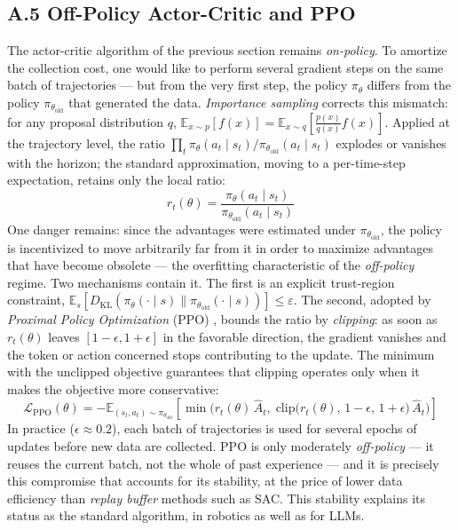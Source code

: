 \documentclass[11pt,a4paper]{article}
\begin{document}
\subsection*{A.5 Off-Policy Actor-Critic and PPO}
The actor-critic algorithm of the previous section remains \emph{on-policy}. To amortize the collection cost, one would like to perform several gradient steps on the same batch of trajectories — but from the very first step, the policy $\pi_\theta$ differs from the policy $\pi_{\theta_{\text{old}}}$ that generated the data. \emph{Importance sampling} corrects this mismatch: for any proposal distribution $q$, $\mathbb{E}_{x \sim p}[f(x)] = \mathbb{E}_{x \sim q}[\frac{p(x)}{q(x)} f(x)]$. Applied at the trajectory level, the ratio $\prod_t \pi_\theta(a_t \mid s_t)/\pi_{\theta_{\text{old}}}(a_t \mid s_t)$ explodes or vanishes with the horizon; the standard approximation, moving to a per-time-step expectation, retains only the local ratio:
\begin{equation}
r_t(\theta) = \frac{\pi_\theta(a_t \mid s_t)}{\pi_{\theta_{\text{old}}}(a_t \mid s_t)}
\end{equation}
One danger remains: since the advantages were estimated under $\pi_{\theta_{\text{old}}}$, the policy is incentivized to move arbitrarily far from it in order to maximize advantages that have become obsolete — the overfitting characteristic of the \emph{off-policy} regime. Two mechanisms contain it. The first is an explicit trust-region constraint, $\mathbb{E}_s[D_{\text{KL}}(\pi_\theta(\cdot \mid s) \parallel \pi_{\theta_{\text{old}}}(\cdot \mid s))] \leq \varepsilon$. The second, adopted by \emph{Proximal Policy Optimization} (PPO) \cite{schulman2017proximal}, bounds the ratio by \emph{clipping}: as soon as $r_t(\theta)$ leaves $[1-\epsilon, 1+\epsilon]$ in the favorable direction, the gradient vanishes and the token or action concerned stops contributing to the update. The minimum with the unclipped objective guarantees that clipping operates only when it makes the objective more conservative:
\begin{equation}
\mathcal{L}_{\text{PPO}}(\theta) = -\mathbb{E}_{(s_t, a_t) \sim \pi_{\theta_{\text{old}}}} \left[ \min\Big( r_t(\theta)\, \hat{A}_t, \; \text{clip}\big(r_t(\theta),\, 1-\epsilon,\, 1+\epsilon\big)\, \hat{A}_t \Big) \right]
\label{eq:ppo}
\end{equation}
In practice ($\epsilon \approx 0.2$), each batch of trajectories is used for several epochs of updates before new data are collected. PPO is only moderately \emph{off-policy} — it reuses the current batch, not the whole of past experience — and it is precisely this compromise that accounts for its stability, at the price of lower data efficiency than \emph{replay buffer} methods such as SAC. This stability explains its status as the standard algorithm, in robotics as well as for LLMs.
\end{document}
